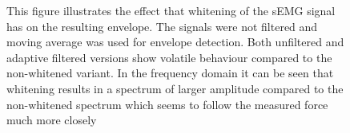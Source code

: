 \begin{figure}[h!t]
	\begin{center}
	\noindent{}
	\end{center}
	\caption{This figure illustrates the effect that whitening of the sEMG signal has on the resulting envelope. The signals were not filtered and moving average was used for envelope detection. Both unfiltered and adaptive filtered versions show volatile behaviour compared to the non-whitened variant. In the frequency domain it can be seen that whitening results in a spectrum of larger amplitude compared to the non-whitened spectrum which seems to follow the measured force much more closely}
	\label{fig:result_prewhitening}
\end{figure}


